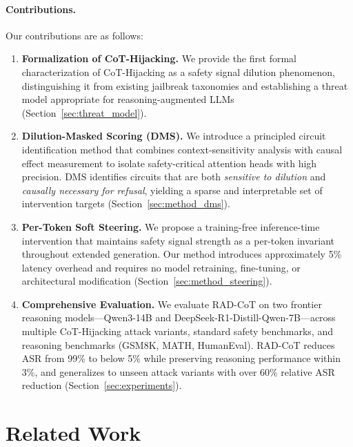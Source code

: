 \documentclass[11pt]{article}
\begin{document}
\paragraph{Contributions.} Our contributions are as follows:
\begin{enumerate}[leftmargin=*, itemsep=2pt, topsep=2pt]
    \item \textbf{Formalization of CoT-Hijacking.} We provide the first formal characterization of CoT-Hijacking as a safety signal dilution phenomenon, distinguishing it from existing jailbreak taxonomies and establishing a threat model appropriate for reasoning-augmented LLMs (Section~\ref{sec:threat_model}).

    \item \textbf{Dilution-Masked Scoring (DMS).} We introduce a principled circuit identification method that combines context-sensitivity analysis with causal effect measurement to isolate safety-critical attention heads with high precision. DMS identifies circuits that are both \emph{sensitive to dilution} and \emph{causally necessary for refusal}, yielding a sparse and interpretable set of intervention targets (Section~\ref{sec:method_dms}).

    \item \textbf{Per-Token Soft Steering.} We propose a training-free inference-time intervention that maintains safety signal strength as a per-token invariant throughout extended generation. Our method introduces approximately 5\% latency overhead and requires no model retraining, fine-tuning, or architectural modification (Section~\ref{sec:method_steering}).

    \item \textbf{Comprehensive Evaluation.} We evaluate RAD-CoT on two frontier reasoning models---Qwen3-14B and DeepSeek-R1-Distill-Qwen-7B---across multiple CoT-Hijacking attack variants, standard safety benchmarks, and reasoning benchmarks (GSM8K, MATH, HumanEval). RAD-CoT reduces ASR from 99\% to below 5\% while preserving reasoning performance within 3\%, and generalizes to unseen attack variants with over 60\% relative ASR reduction (Section~\ref{sec:experiments}).
\end{enumerate}

\section{Related Work}
\label{sec:related_work}
\end{document}

